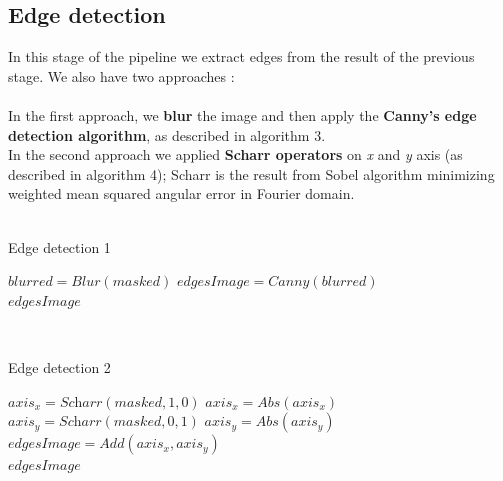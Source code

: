 \documentclass[journal]{IEEEtran}
\begin{document}
\subsection{Edge detection}
In this stage of the pipeline we extract edges from the result of the previous stage. We also have two approaches :
\\
\\
In the first approach, we \textbf{blur} the image and then apply the \textbf{Canny's edge detection algorithm}, as described in algorithm 3. 
\\
In the second approach we applied \textbf{Scharr operators} on \textit{x} and \textit{y} axis (as described in algorithm 4); Scharr is the result from Sobel algorithm minimizing weighted mean squared angular error in Fourier domain.
\\
\\
\begin{algorithm}
\caption{Edge detection 1}
\begin{algorithmic}[1]
\State $blurred    = \textit{Blur}(masked)$
\State $edgesImage = \textit{Canny}(blurred)$\\
\Return $edgesImage$
\end{algorithmic}
\end{algorithm}
\\
\begin{algorithm}
\caption{Edge detection 2}
\begin{algorithmic}[1]
\State $axis_x   = \textit{Scharr}(masked, 1, 0)$
\State $axis_x   = \textit{Abs}(axis_x)$
\State $axis_y   = \textit{Scharr}(masked, 0, 1)$
\State $axis_y   = \textit{Abs}(axis_y)$
\State $edgesImage   = \textit{Add}(axis_x, axis_y)$ \\
\Return $edgesImage$
\end{algorithmic}
\end{algorithm}
\\
\\
\end{document}
